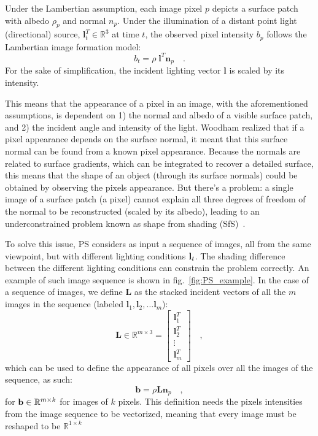 Under the Lambertian assumption, each image pixel $p$ depicts a surface patch with albedo $\rho_p$ and normal $n_p$. Under the illumination of a distant point light (directional) source, $\mathbf{l}_t^T \in \mathbb{R}^3$ at time $t$, the observed pixel intensity $b_p$ follows the Lambertian image formation model:
\begin{equation}
b_t =  \rho \; \mathbf{l}^T \mathbf{n}_p \quad.
\end{equation}
For the sake of simplification, the incident lighting vector $\mathbf{l}$ is scaled by its intensity.

This means that the appearance of a pixel in an image, with the aforementioned assumptions, is dependent on 1) the normal and albedo of a visible surface patch, and 2) the incident angle and intensity of the light. Woodham realized that if a pixel appearance depends on the surface normal, it meant that this surface normal can be found from a known pixel appearance. Because the normals are related to surface gradients, which can be integrated to recover a detailed surface, this means that the shape of an object (through its surface normals) could be obtained by observing the pixels appearance. But there's a problem: a single image of a surface patch (a pixel) cannot explain all three degrees of freedom of the normal to be reconstructed (scaled by its albedo), leading to an underconstrained problem known as shape from shading (SfS)~\cite{Horn1989}.

To solve this issue, PS considers as input a sequence of images, all from the same viewpoint, but with different lighting conditions ${\bf l}_t$. The shading difference between the different lighting conditions can constrain the problem correctly. An example of such image sequence is shown in fig.~\ref{fig:PS_example}. In the case of a sequence of images, we define $\mathbf{L}$ as the stacked incident vectors of all the $m$ images in the sequence (labeled $\mathbf{l}_{1}, \mathbf{l}_{2}, \dots \mathbf{l}_{m}$):
\begin{equation}
\mathbf{L} \in \mathbb{R}^{m \times 3} =
\begin{bmatrix}
    \mathbf{l}_{1}^T \\
    \mathbf{l}_{2}^T \\
    \vdots \\
    \mathbf{l}_{m}^T
\end{bmatrix}
\quad,
\end{equation}
which can be used to define the appearance of all pixels over all the images of the sequence, as such:
\begin{equation}
\label{eq:lamb_refl}
\mathbf{b} =  \rho \mathbf{L} \mathbf{n}_p \quad,
\end{equation}
for ${\bf b} \in \mathbb{R}^{m \times k}$ for images of $k$ pixels. This definition needs the pixels intensities from the image sequence to be vectorized, meaning that every image must be reshaped to be $\mathbb{R}^{1 \times k}$

